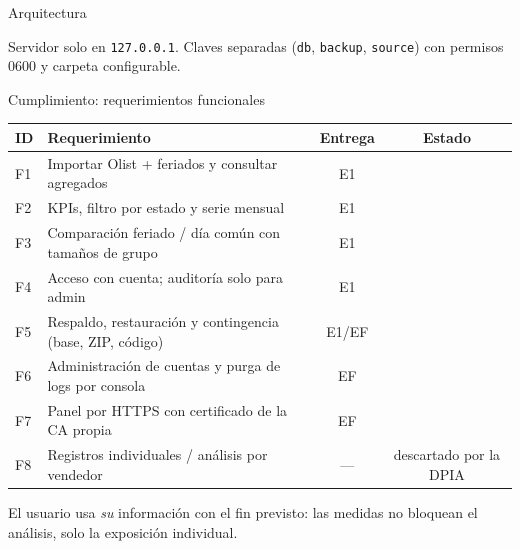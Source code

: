 \documentclass[aspectratio=169,11pt]{beamer}
\newcommand{\ok}{\textcolor{teal}{\textbf{\checkmark}}}
\begin{document}
\begin{frame}{Arquitectura}
\centering
{}
\bigskip

\small Servidor solo en \texttt{127.0.0.1}. Claves separadas (\texttt{db}, \texttt{backup}, \texttt{source}) con permisos 0600 y carpeta configurable.
\end{frame}

\begin{frame}{Cumplimiento: requerimientos funcionales}
\footnotesize
\begin{tabularx}{\textwidth}{@{}l Y c c@{}}
\toprule
ID & Requerimiento & Entrega & Estado\\
\midrule
F1 & Importar Olist + feriados y consultar agregados & E1 & \ok\\
F2 & KPIs, filtro por estado y serie mensual & E1 & \ok\\
F3 & Comparación feriado / día común con tamaños de grupo & E1 & \ok\\
F4 & Acceso con cuenta; auditoría solo para admin & E1 & \ok\\
F5 & Respaldo, restauración y contingencia (base, ZIP, código) & E1/EF & \ok\\
F6 & Administración de cuentas y purga de logs por consola & EF & \ok\\
F7 & Panel por HTTPS con certificado de la CA propia & EF & \ok\\
F8 & Registros individuales / análisis por vendedor & --- & \textcolor{warn}{descartado por la DPIA}\\
\bottomrule
\end{tabularx}
\medskip

\small El usuario usa \emph{su} información con el fin previsto: las medidas no bloquean el análisis, solo la exposición individual.
\end{frame}
\end{document}
